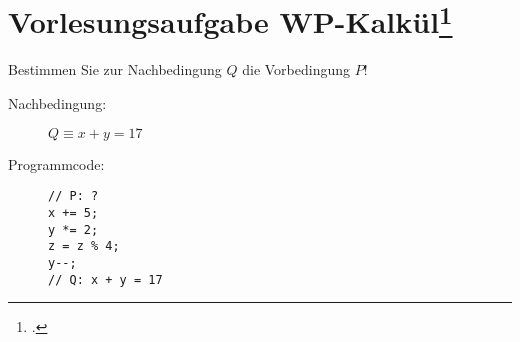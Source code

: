 \documentclass{lehramt-informatik-aufgabe}
\begin{document}
\let\wp=\liWpKalkuel
\let\equivalent=\liWpEquivalent
\let\erklaerung=\liWpErklaerung


\section{Vorlesungsaufgabe WP-Kalkül\footcite[Seite 21-26]{sosy:fs:5}}


Bestimmen Sie zur Nachbedingung $Q$ die Vorbedingung $P$!

\begin{description}
\item[Nachbedingung:] $Q \equiv x + y = 17$

\item[Programmcode:] \strut

\begin{verbatim}
// P: ?
x += 5;
y *= 2;
z = z % 4;
y--;
// Q: x + y = 17
\end{verbatim}
\end{description}
\end{document}
